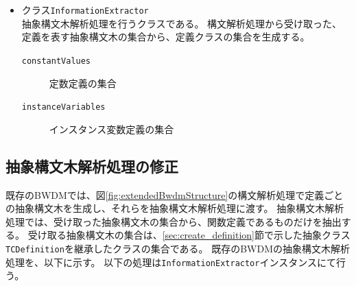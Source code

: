 \documentclass[uplatex, report, a4j, 10pt]{jsbook}
\newcommand\ttt[1]{\texttt{#1}}
\begin{document}
\begin{itemize}
  \item クラス\ttt{InformationExtractor}\\
        抽象構文木解析処理を行うクラスである。
        構文解析処理から受け取った、定義を表す抽象構文木の集合から、定義クラスの集合を生成する。
        \begin{description}
          \item[\ttt{\ttt{constantValues}}] 定数定義の集合
          \item[\ttt{\ttt{instanceVariables}}] インスタンス変数定義の集合
        \end{description}

\end{itemize}

\subsection{抽象構文木解析処理の修正}

既存のBWDMでは、図\ref{fig:extendedBwdmStructure}の構文解析処理で定義ごとの抽象構文木を生成し、それらを抽象構文木解析処理に渡す。
抽象構文木解析処理では、受け取った抽象構文木の集合から、関数定義であるものだけを抽出する。
受け取る抽象構文木の集合は、\ref{sec:create_definition}節で示した抽象クラス\ttt{TCDefinition}を継承したクラスの集合である。
既存のBWDMの抽象構文木解析処理を、以下に示す。
以下の処理は\ttt{InformationExtractor}インスタンスにて行う。
\end{document}
